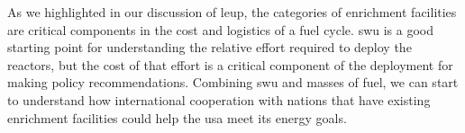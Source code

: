 As we highlighted in our discussion of \gls{leup}, the categories of enrichment facilities are critical components in the cost and logistics of a fuel cycle. \gls{swu} is a good starting point for understanding the relative effort required to deploy the reactors, but the cost of that effort is a critical component of the deployment for making policy recommendations. Combining \gls{swu} and masses of fuel, we can start to understand how international cooperation with nations that have existing enrichment facilities could help the \gls{usa} meet its energy goals.


